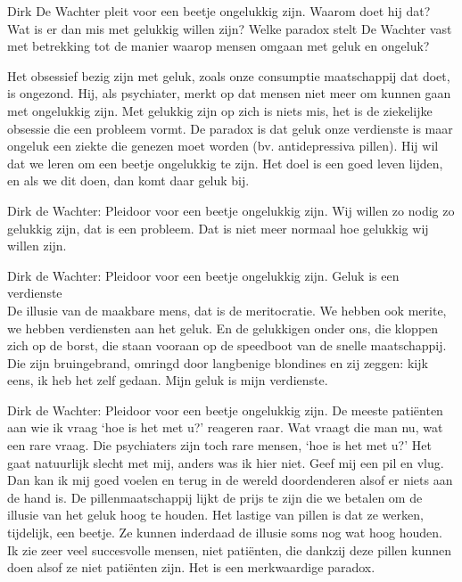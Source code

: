 \documentclass[main.tex]{subfiles}
\begin{document}
\begin{examenvraag}
    \begin{vraag}
        Dirk De Wachter pleit voor een beetje ongelukkig zijn.
        Waarom doet hij dat? Wat is er dan mis met gelukkig willen zijn?
        Welke paradox stelt De Wachter vast met betrekking tot de manier waarop mensen omgaan met geluk en ongeluk?
    \end{vraag}

    \begin{antwoord}
        Het obsessief bezig zijn met geluk, zoals onze consumptie maatschappij dat doet, is ongezond.
        Hij, als psychiater, merkt op dat mensen niet meer om kunnen gaan met ongelukkig zijn.
        Met gelukkig zijn op zich is niets mis, het is de ziekelijke obsessie die een probleem vormt.
        De paradox is dat geluk onze verdienste is maar ongeluk een ziekte die genezen moet worden (bv. antidepressiva pillen). Hij wil dat we leren om een beetje ongelukkig te zijn. Het doel is een goed leven lijden, en als we dit doen, dan komt daar geluk bij.
        \begin{citaat}{Dirk de Wachter: Pleidoor voor een beetje ongelukkig zijn.}
            Wij willen zo nodig zo gelukkig zijn, dat is een probleem.
            Dat is niet meer normaal hoe gelukkig wij willen zijn.
        \end{citaat}
        \begin{citaat}{Dirk de Wachter: Pleidoor voor een beetje ongelukkig zijn.}
            Geluk is een verdienste\\
            De illusie van de maakbare mens, dat is de meritocratie.
            We hebben ook merite, we hebben verdiensten aan het geluk.
            En de gelukkigen onder ons, die kloppen zich op de borst, die staan vooraan op de speedboot van de snelle maatschappij.
            Die zijn bruingebrand, omringd door langbenige blondines en zij zeggen: kijk eens, ik heb het zelf gedaan.
            Mijn geluk is mijn verdienste.
        \end{citaat}
        \begin{citaat}{Dirk de Wachter: Pleidoor voor een beetje ongelukkig zijn.}
            De meeste pati\"enten aan wie ik vraag `hoe is het met u?' reageren raar.
            Wat vraagt die man nu, wat een rare vraag.
            Die psychiaters zijn toch rare mensen, `hoe is het met u?'
            Het gaat natuurlijk slecht met mij, anders was ik hier niet.
            Geef mij een pil en vlug.
            Dan kan ik mij goed voelen en terug in de wereld doordenderen alsof er niets aan de hand is.
            De pillenmaatschappij lijkt de prijs te zijn die we betalen om de illusie van het geluk hoog te houden.
            Het lastige van pillen is dat ze werken, tijdelijk, een beetje.
            Ze kunnen inderdaad de illusie soms nog wat hoog houden.
            Ik zie zeer veel succesvolle mensen, niet pati\"enten, die dankzij deze pillen kunnen doen alsof ze niet pati\"enten zijn.
            Het is een merkwaardige paradox.
        \end{citaat}
    \end{antwoord}
\end{examenvraag}
\end{document}
